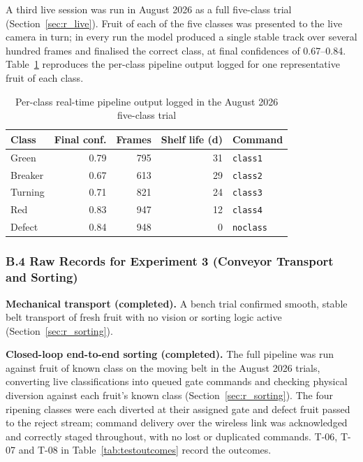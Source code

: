 A third live session was run in August 2026 as a full five-class trial (Section~\ref{sec:r_live}). Fruit of each of the five classes was presented to the live camera in turn; in every run the model produced a single stable track over several hundred frames and finalised the correct class, at final confidences of 0.67--0.84. Table~\ref{tab:appendixB_live5} reproduces the per-class pipeline output logged for one representative fruit of each class.

\begin{table}[H]
\caption{Per-class real-time pipeline output logged in the August 2026 five-class trial}
\label{tab:appendixB_live5}
\centering
\begin{tabular}{lrrrl}
\toprule
\textbf{Class} & \textbf{Final conf.} & \textbf{Frames} & \textbf{Shelf life (d)} & \textbf{Command} \\
\midrule
Green   & 0.79 & 795 & 31 & \texttt{class1} \\
Breaker & 0.67 & 613 & 29 & \texttt{class2} \\
Turning & 0.71 & 821 & 24 & \texttt{class3} \\
Red     & 0.83 & 947 & 12 & \texttt{class4} \\
Defect  & 0.84 & 948 & 0  & \texttt{noclass} \\
\bottomrule
\end{tabular}
\end{table}

\subsubsection*{B.4 Raw Records for Experiment 3 (Conveyor Transport and Sorting)}

\textbf{Mechanical transport (completed).} A bench trial confirmed smooth, stable belt transport of fresh fruit with no vision or sorting logic active (Section~\ref{sec:r_sorting}). 

\textbf{Closed-loop end-to-end sorting (completed).} The full pipeline was run against fruit of known class on the moving belt in the August 2026 trials, converting live classifications into queued gate commands and checking physical diversion against each fruit's known class (Section~\ref{sec:r_sorting}). The four ripening classes were each diverted at their assigned gate and defect fruit passed to the reject stream; command delivery over the wireless link was acknowledged and correctly staged throughout, with no lost or duplicated commands. T-06, T-07 and T-08 in Table~\ref{tab:testoutcomes} record the outcomes. 

